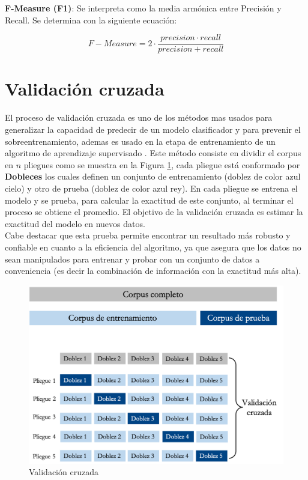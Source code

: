 \textbf{F-Measure (F1)}: Se interpreta como la media armónica entre Precisión y Recall. Se determina
con la siguiente ecuación:

\begin{equation}\label{eq:3}
	 F-Measure = 2 \cdot \frac{precision \cdot recall}{precision+recall}
\end{equation}


\section{Validación cruzada}


El proceso de validación cruzada es uno de los métodos mas usados para generalizar la capacidad de predecir de un modelo clasificador y para prevenir el sobre\-entrenamiento, ademas es usado en la etapa de entrenamiento de un algoritmo de aprendizaje supervisado \citep{CTValidacionC}. Este método consiste en dividir el corpus en $n$ pliegues como se muestra en la Figura \ref{cp3:diagramacv}, cada pliegue está conformado por \textbf{Dobleces} los cuales definen un conjunto de entrenamiento (doblez de color azul cielo) y otro de prueba (doblez de color azul rey). En cada pliegue se entrena el modelo y se prueba, para calcular la exactitud de este conjunto, al terminar el proceso se obtiene el promedio. El objetivo de la validación cruzada es estimar la exactitud del modelo en nuevos datos.\\

Cabe destacar que esta prueba permite encontrar un resultado más robusto y confiable en cuanto a la eficiencia del algoritmo, ya que asegura que los datos no sean manipulados para entrenar y probar con un conjunto de datos a conveniencia (es decir la combinación de información con la exactitud más alta).




\begin{figure}[h]
\centering
\includegraphics[scale=.75]{imagenes/Capitulo3/validacionc.png}
\caption{Validación cruzada}
\label{cp3:diagramacv}
\end{figure}

